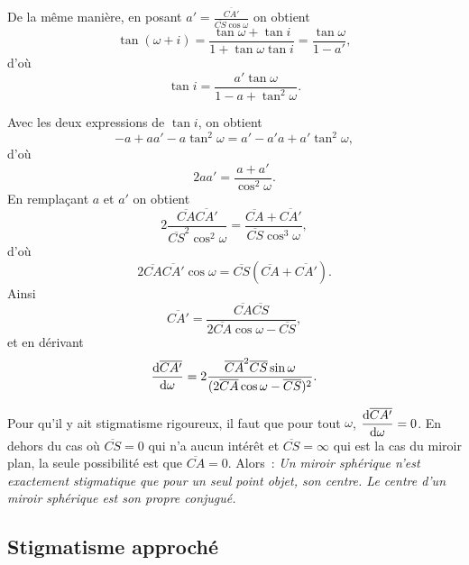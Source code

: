 De la même manière, en posant \(a' = \frac{\overline{CA'}}{\overline{CS} \cos 
\omega}\) on obtient
\begin{equation}%
  \tan(\omega+i) = \frac{\tan \omega +\tan i}{1+ \tan\omega \tan i} =\frac{\tan 
  \omega}{1-a'},
\end{equation}%
d'où
\begin{equation}%
  \tan i = \frac{a' \tan \omega}{1-a+\tan^2 \omega}.
\end{equation}%

Avec les deux expressions de \(\tan i\), on obtient
\begin{equation}%
  -a +aa' -a\tan^2\omega = a'-a'a+a'\tan^2\omega,
\end{equation}%
d'où
\begin{equation}%
  2aa' = \frac{a+a'}{\cos^2\omega}.
\end{equation}%
En remplaçant \(a\) et \(a'\) on obtient
\begin{equation}%
  2 \frac{\overline{CA}\overline{CA'}}{\overline{CS}^2\cos^2\omega} = 
  \frac{\overline{CA} + \overline{CA'}}{\overline{CS} \cos^3\omega},
\end{equation}%
d'où
\begin{equation}%
  \label{eq:stigrigoureux}
  2 \overline{CA} \overline{CA'} \cos\omega = \overline{CS}(\overline{CA}+ 
  \overline{CA'}).
\end{equation}%
Ainsi
\begin{equation}%
  \overline{CA'} = \frac{\overline{CA} \overline{CS}}{2 \overline{CA} \cos 
  \omega - \overline{CS}},
\end{equation}%
et en dérivant
\begin{equation}%
  \derived{\overline{CA'}}{\omega} = 2 \frac{\overline{CA}^2 \overline{CS} 
  \sin\omega}{(2 \overline{CA} \cos \omega - \overline{CS})^2}.
\end{equation}%

Pour qu'il y ait stigmatisme rigoureux, il faut que pour tout \(\omega\), 
\(\dfrac{\mathrm{d} \overline{CA'}}{\mathrm{d} \omega} = 0\). En dehors du cas où 
\(\overline{CS}=0\) qui n'a aucun intérêt et \(\overline{CS}=\infty\) qui est 
la cas du miroir plan, la seule possibilité est que \(\overline{CA}=0\). 
Alors~:
\emph{Un miroir sphérique n'est exactement stigmatique que  pour un seul point 
objet, son centre. Le centre d'un miroir sphérique est son propre conjugué.}%

\subsection{Stigmatisme approché}%
\label{chap7-subsec:stigmatismeapproche}%

